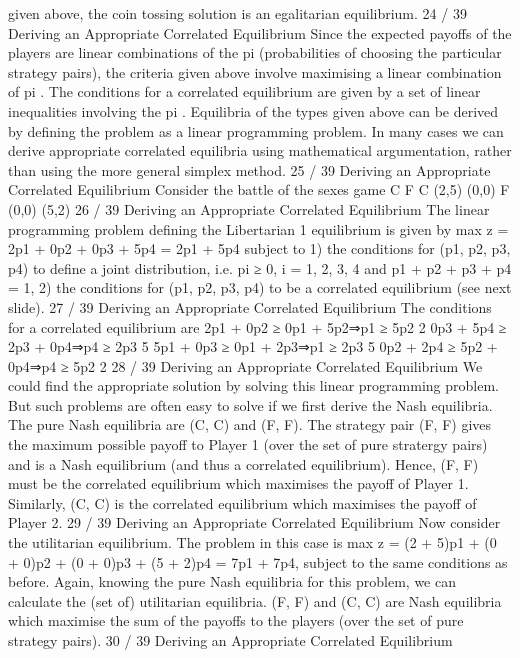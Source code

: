 given above, the coin tossing solution is an egalitarian equilibrium.
24 / 39
Deriving an Appropriate Correlated Equilibrium
Since the expected payoffs of the players are linear combinations of
the pi (probabilities of choosing the particular strategy pairs), the
criteria given above involve maximising a linear combination of pi
.
The conditions for a correlated equilibrium are given by a set of
linear inequalities involving the pi
.
Equilibria of the types given above can be derived by defining the
problem as a linear programming problem.
In many cases we can derive appropriate correlated equilibria using
mathematical argumentation, rather than using the more general
simplex method.
25 / 39
Deriving an Appropriate Correlated Equilibrium
Consider the battle of the sexes game
C F
C (2,5) (0,0)
F (0,0) (5,2)
26 / 39
Deriving an Appropriate Correlated Equilibrium
The linear programming problem defining the Libertarian 1
equilibrium is given by
max z = 2p1 + 0p2 + 0p3 + 5p4 = 2p1 + 5p4
subject to
1) the conditions for (p1, p2, p3, p4) to define a joint distribution,
i.e. pi ≥ 0, i = 1, 2, 3, 4 and p1 + p2 + p3 + p4 = 1,
2) the conditions for (p1, p2, p3, p4) to be a correlated equilibrium
(see next slide).
27 / 39
Deriving an Appropriate Correlated Equilibrium
The conditions for a correlated equilibrium are
2p1 + 0p2 ≥ 0p1 + 5p2⇒p1 ≥
5p2
2
0p3 + 5p4 ≥ 2p3 + 0p4⇒p4 ≥
2p3
5
5p1 + 0p3 ≥ 0p1 + 2p3⇒p1 ≥
2p3
5
0p2 + 2p4 ≥ 5p2 + 0p4⇒p4 ≥
5p2
2
28 / 39
Deriving an Appropriate Correlated Equilibrium
We could find the appropriate solution by solving this linear
programming problem. But such problems are often easy to solve if
we first derive the Nash equilibria.
The pure Nash equilibria are (C, C) and (F, F). The strategy pair
(F, F) gives the maximum possible payoff to Player 1 (over the set
of pure stratergy pairs) and is a Nash equilibrium (and thus a
correlated equilibrium).
Hence, (F, F) must be the correlated equilibrium which maximises
the payoff of Player 1.
Similarly, (C, C) is the correlated equilibrium which maximises the
payoff of Player 2.
29 / 39
Deriving an Appropriate Correlated Equilibrium
Now consider the utilitarian equilibrium. The problem in this case
is
max z = (2 + 5)p1 + (0 + 0)p2 + (0 + 0)p3 + (5 + 2)p4 = 7p1 + 7p4,
subject to the same conditions as before.
Again, knowing the pure Nash equilibria for this problem, we can
calculate the (set of) utilitarian equilibria.
(F, F) and (C, C) are Nash equilibria which maximise the sum of
the payoffs to the players (over the set of pure strategy pairs).
30 / 39
Deriving an Appropriate Correlated Equilibrium
